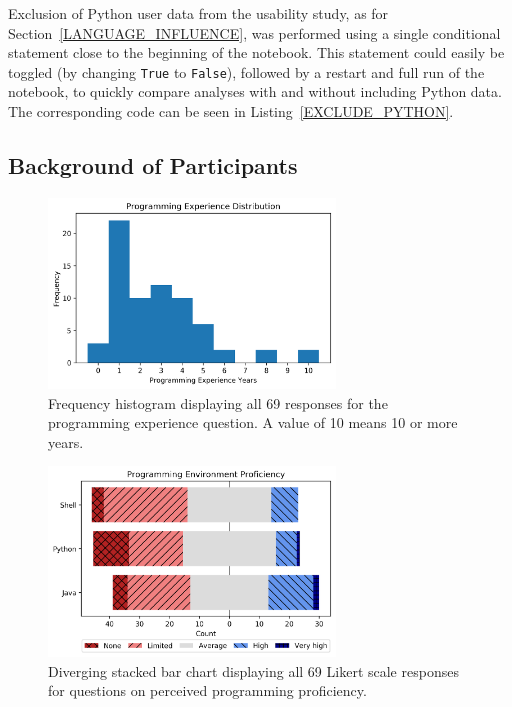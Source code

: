   Exclusion of Python user data from the usability study, as for Section~\ref{LANGUAGE_INFLUENCE}, was performed using a single conditional statement close to the beginning of the notebook. This statement could easily be toggled (by changing \texttt{True} to \texttt{False}), followed by a restart and full run of the notebook, to quickly compare analyses with and without including Python data. The corresponding code can be seen in Listing~\ref{EXCLUDE_PYTHON}.


\subsection{Background of Participants}
  
  \begin{figure}[ht]
    \centering
    \includegraphics[width=3in]{./figs/programming-experience-distribution.png}
    \caption{Frequency histogram displaying all 69 responses for the programming experience question. A value of 10 means 10 or more years.}
    \label{PROG_EXP}
  \end{figure}
  
  \begin{figure}[ht]
    \centering
    \includegraphics[width=3in]{./figs/programming-environment-proficiency.png}
    \caption{Diverging stacked bar chart \cite{HEIBERGER:DSBC:2014} displaying all 69 Likert scale responses for questions on perceived programming proficiency.}
    \label{PROG_ENV_PROF}
  \end{figure}
  
